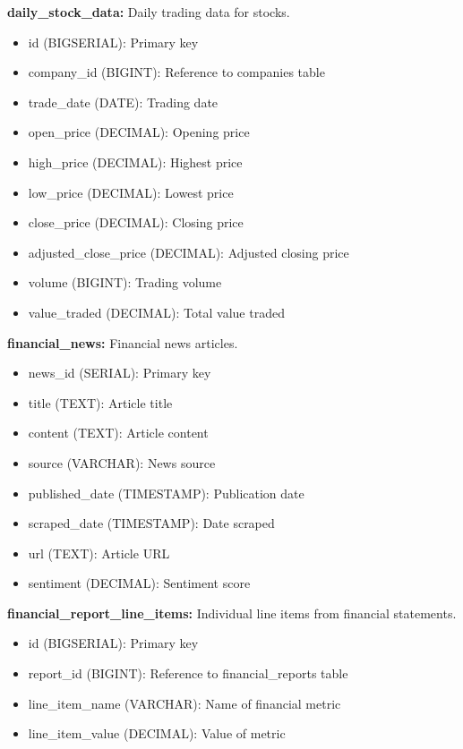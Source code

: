 \documentclass[12pt,a4paper]{report}
\begin{document}
\textbf{daily\_stock\_data:} Daily trading data for stocks.
\begin{itemize}
    \item id (BIGSERIAL): Primary key
    \item company\_id (BIGINT): Reference to companies table
    \item trade\_date (DATE): Trading date
    \item open\_price (DECIMAL): Opening price
    \item high\_price (DECIMAL): Highest price
    \item low\_price (DECIMAL): Lowest price
    \item close\_price (DECIMAL): Closing price
    \item adjusted\_close\_price (DECIMAL): Adjusted closing price
    \item volume (BIGINT): Trading volume
    \item value\_traded (DECIMAL): Total value traded
\end{itemize}

\textbf{financial\_news:} Financial news articles.
\begin{itemize}
    \item news\_id (SERIAL): Primary key
    \item title (TEXT): Article title
    \item content (TEXT): Article content
    \item source (VARCHAR): News source
    \item published\_date (TIMESTAMP): Publication date
    \item scraped\_date (TIMESTAMP): Date scraped
    \item url (TEXT): Article URL
    \item sentiment (DECIMAL): Sentiment score
\end{itemize}

\textbf{financial\_report\_line\_items:} Individual line items from financial statements.
\begin{itemize}
    \item id (BIGSERIAL): Primary key
    \item report\_id (BIGINT): Reference to financial\_reports table
    \item line\_item\_name (VARCHAR): Name of financial metric
    \item line\_item\_value (DECIMAL): Value of metric
\end{itemize}
\end{document}

